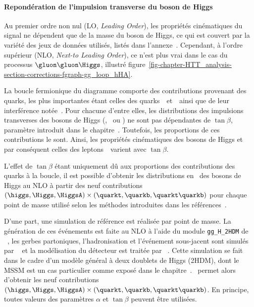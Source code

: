 \paragraph{Repondération de l'impulsion transverse du boson de Higgs}
Au premier ordre non nul (LO, \emph{Leading Order}), les propriétés cinématiques du signal ne dépendent que de la masse du boson de Higgs, ce qui est couvert par la variété des jeux de données utilisés, listés dans l'annexe~.
Cependant, à l'ordre supérieur (NLO, \emph{Next-to Leading Order}),
ce n'est plus vrai dans le cas du processus $\gluon\gluon\Higgs$,
illustré figure~\ref{fig-chapter-HTT_analysis-section-corrections-fgraph-gg_loop_hHA}.
\par
La boucle fermionique du diagramme comporte des contributions provenant des quarks,
les plus importantes étant celles des quarks~\quarkt\ et~\quarkb\ ainsi que de leur interférence notée~\quarkt\quarkb.
Pour chacune d'entre elles, les distributions des impulsions transverses des bosons de Higgs (\higgs, \Higgs\ ou \HiggsA) ne sont pas dépendantes de $\tan\beta$, paramètre introduit dans le chapitre~.
Toutefois, les proportions de ces contributions le sont.
Ainsi,
les propriétés cinématiques des bosons de Higgs
et par conséquent celles des leptons~\tau\
varient avec $\tan\beta$.
\par
L'effet de $\tan\beta$ étant uniquement dû aux proportions des contributions des quarks à la boucle,
il est possible d'obtenir les distributions en \pT\ des bosons de Higgs au NLO
à partir des neuf contributions $(\higgs,\Higgs,\HiggsA)\times(\quarkt,\quarkb,\quarkt\quarkb)$
pour chaque point de masse utilisé
selon les méthodes introduites dans les références~\cite{Bagnaschi:2015qta,Bagnaschi:2015bop}.
\par
D'une part, une simulation de référence est réalisée par point de masse.
La génération de ces événements est faite au NLO à l'aide du module \texttt{gg\_H\_2HDM} de \POWHEG~\cite{Alioli:2010xd},
les gerbes partoniques, l'hadronisation et l'événement sous-jacent sont simulés par \PYTHIA~\cite{pythia8.2} et
la modélisation du détecteur est traitée par \GEANTfour~\cite{geant4_2003,geant4_2006,geant4_2016}.
Cette simulation se fait dans le cadre d'un modèle général à deux doublets de Higgs (2HDM), dont le MSSM est un cas particulier comme exposé dans le chapitre~.
\POWHEG\ permet alors d'obtenir les neuf contributions $(\higgs,\Higgs,\HiggsA)\times(\quarkt,\quarkb,\quarkt\quarkb)$.
En principe, toutes valeurs des paramètres $\alpha$ et $\tan\beta$ peuvent être utilisées.
